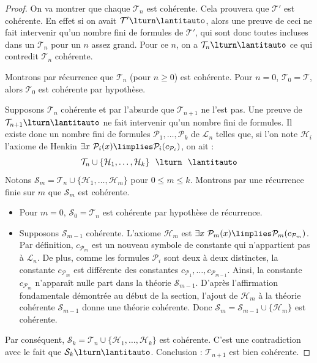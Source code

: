 \documentclass[11pt,class=report,crop=false]{standalone}
\begin{document}
\begin{proof}
    On va montrer que chaque $\mathcal{T}_n$ est cohérente. Cela prouvera que $\mathcal{T}'$ est cohérente. En effet si on avait $\mathcal{T}' \lturn \lantitauto$, alors une preuve de ceci ne fait intervenir qu'un nombre fini de formules de $\mathcal{T}'$, qui sont donc toutes incluses dans un $\mathcal{T}_n$ pour un $n$ assez grand. Pour ce $n$, on a $\mathcal{T}_n \lturn \lantitauto$ ce qui contredit $\mathcal{T}_n$ cohérente.
    
    Montrons par récurrence que $\mathcal{T}_n$ (pour $n \ge 0$) est cohérente.
    Pour $n=0$, $\mathcal{T}_0 = \mathcal{T}$, alors $\mathcal{T}_0$ est cohérente par hypothèse.
    
    Supposons $\mathcal{T}_n$ cohérente et par l'absurde que $\mathcal{T}_{n+1}$ ne l'est pas.
    Une preuve de $\mathcal{T}_{n+1} \lturn \lantitauto$ ne fait intervenir qu'un nombre fini de formules. Il existe donc un nombre fini de formules $\mathcal{P}_1, \ldots, \mathcal{P}_k$ de $\mathcal{L}_n$ telles que, si l'on note $\mathcal{H}_i$ l'axiome de Henkin \og{}$\exists x\ \mathcal{P}_i(x) \limplies \mathcal{P}_i(c_{\mathcal{P}_i})$\fg{}, on ait :
    \[
        \mathcal{T}_n \cup \{\mathcal{H}_1, \ldots, \mathcal{H}_k\} \ \ \lturn \ \ \lantitauto
    \]
    Notons $\mathcal{S}_m = \mathcal{T}_n \cup \{\mathcal{H}_1, \ldots, \mathcal{H}_m\}$ pour $0 \le m \le k$.
    Montrons par une récurrence finie sur $m$ que $\mathcal{S}_m$ est cohérente.
    \begin{itemize}
        \item Pour $m=0$, $\mathcal{S}_0 = \mathcal{T}_n$ est cohérente par hypothèse de récurrence.
        \item Supposons $\mathcal{S}_{m-1}$ cohérente. L'axiome $\mathcal{H}_m$ est $\exists x\ \mathcal{P}_m(x) \limplies \mathcal{P}_m(c_{\mathcal{P}_m})$.
        Par définition, $c_{\mathcal{P}_m}$ est un nouveau symbole de constante qui n'appartient pas à $\mathcal{L}_n$. De plus, comme les formules $\mathcal{P}_i$ sont deux à deux distinctes, la constante $c_{\mathcal{P}_m}$ est différente des constantes $c_{\mathcal{P}_1}, \ldots, c_{\mathcal{P}_{m-1}}$.
        Ainsi, la constante $c_{\mathcal{P}_m}$ n'apparaît nulle part dans la théorie $\mathcal{S}_{m-1}$.
        D'après l'affirmation fondamentale démontrée au début de la section, l'ajout de $\mathcal{H}_m$ à la théorie cohérente $\mathcal{S}_{m-1}$ donne une théorie cohérente.
        Donc $\mathcal{S}_m = \mathcal{S}_{m-1} \cup \{\mathcal{H}_m\}$ est cohérente.
    \end{itemize}
    Par conséquent, $\mathcal{S}_k = \mathcal{T}_n \cup \{\mathcal{H}_1, \ldots, \mathcal{H}_k\}$ est cohérente.
    C'est une contradiction avec le fait que $\mathcal{S}_k \lturn \lantitauto$.
    Conclusion : $\mathcal{T}_{n+1}$ est bien cohérente.
\end{proof}
\end{document}
